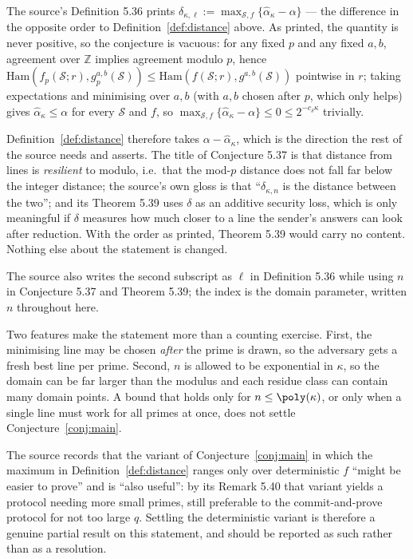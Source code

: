 \documentclass{conjura-conjecture}
\newcommand{\Ham}{\mathrm{Ham}}
\newcommand{\Sc}{\mathcal{S}}
\begin{document}
\begin{remark}\label{rem:sign}
The source's Definition 5.36 prints $\delta_{\kappa,\ell} :=
\max_{\Sc,f}\{\widehat{\alpha}_{\kappa} - \alpha\}$ --- the difference in
the opposite order to Definition~\ref{def:distance} above. As printed,
the quantity is never positive, so the conjecture is vacuous: for any
fixed $p$ and any fixed $a,b$, agreement over $\mathbb{Z}$ implies
agreement modulo $p$, hence $\Ham(f_{p}(\Sc;r), g^{a,b}_{p}(\Sc)) \le
\Ham(f(\Sc;r), g^{a,b}(\Sc))$ pointwise in $r$; taking expectations and
minimising over $a, b$ (with $a,b$ chosen after $p$, which only helps)
gives $\widehat{\alpha}_{\kappa} \le \alpha$ for every $\Sc$ and $f$, so
$\max_{\Sc,f}\{\widehat{\alpha}_{\kappa} - \alpha\} \le 0 \le
2^{-c_{\delta}\kappa}$ trivially.

Definition~\ref{def:distance} therefore takes $\alpha -
\widehat{\alpha}_{\kappa}$, which is the direction the rest of the source
needs and asserts. The title of Conjecture 5.37 is that distance from
lines is \emph{resilient} to modulo, i.e.\ that the mod-$p$ distance does
not fall far below the integer distance; the source's own gloss is that
``$\delta_{\kappa,n}$ is the distance between the two''; and its
Theorem 5.39 uses $\delta$ as an additive security loss, which is only
meaningful if $\delta$ measures how much closer to a line the sender's
answers can look after reduction. With the order as printed, Theorem 5.39
would carry no content. Nothing else about the statement is changed.

The source also writes the second subscript as $\ell$ in
Definition 5.36 while using $n$ in Conjecture 5.37 and Theorem 5.39; the
index is the domain parameter, written $n$ throughout here.
\end{remark}

\begin{remark}
Two features make the statement more than a counting exercise. First, the
minimising line may be chosen \emph{after} the prime is drawn, so the
adversary gets a fresh best line per prime. Second, $n$ is allowed to be
exponential in $\kappa$, so the domain can be far larger than the
modulus and each residue class can contain many domain points. A bound
that holds only for $n \le \poly(\kappa)$, or only when a single line
must work for all primes at once, does not settle
Conjecture~\ref{conj:main}.
\end{remark}

\begin{remark}
The source records that the variant of Conjecture~\ref{conj:main} in
which the maximum in Definition~\ref{def:distance} ranges only over
deterministic $f$ ``might be easier to prove'' and is ``also useful'':
by its Remark 5.40 that variant yields a protocol needing more small
primes, still preferable to the commit-and-prove protocol for not too
large $q$. Settling the deterministic variant is therefore a genuine
partial result on this statement, and should be reported as such rather
than as a resolution.
\end{remark}
\end{document}

